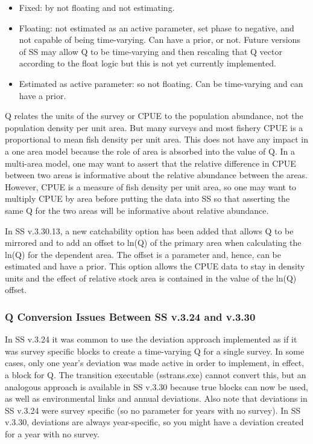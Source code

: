 \begin{itemize}
	\item Fixed: by not floating and not estimating.

	\item Floating: not estimated as an active parameter, set phase to negative, and not capable of being time-varying.  Can have a prior, or not. Future versions of SS may allow Q to be time-varying and then rescaling that Q vector according to the float logic but this is not yet currently implemented.

	\item Estimated as active parameter: so not floating. Can be time-varying and can have a prior.
\end{itemize}


Q relates the units of the survey or CPUE to the population abundance, not the population density per unit area.  But many surveys and most fishery CPUE is a proportional to mean fish density per unit area.  This does not have any impact in a one area model because the role of area is absorbed into the value of Q.  In a multi-area model, one may want to assert that the relative difference in CPUE between two areas is informative about the relative abundance between the areas.   However, CPUE is a measure of fish density per unit area, so one may want to multiply CPUE by area before putting the data into SS so that asserting the same Q for the two areas will be informative about relative abundance.

In SS v.3.30.13, a new catchability option has been added that allows Q to be mirrored and to add an offset to ln(Q) of the primary area when calculating the ln(Q) for the dependent area. The offset is a parameter and, hence, can be estimated and have a prior. This option allows the CPUE data to stay in density units and the effect of relative stock area is contained in the value of the ln(Q) offset.


\subsubsection{Q Conversion Issues Between SS v.3.24 and v.3.30}
In SS v.3.24 it was common to use the deviation approach implemented as if it was survey specific blocks to create a time-varying Q for a single survey.  In some cases, only one year's deviation was made active in order to implement, in effect, a block for Q.  The transition executable (sstrans.exe) cannot convert this, but an analogous approach is available in SS v.3.30 because true blocks can now be used, as well as environmental links and annual deviations. Also note that deviations in SS v.3.24 were survey specific (so no parameter for years with no survey). In SS v.3.30, deviations are always year-specific, so you might have a deviation created for a year with no survey.

